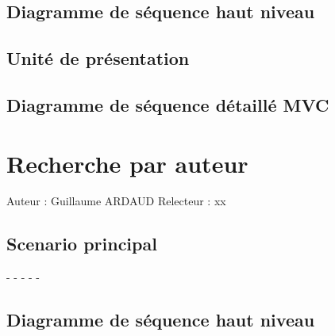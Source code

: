 \documentclass[a4paper,10pt]{report}
\begin{document}
\bigskip

\section*{Diagramme de séquence haut niveau}

\newpage

\section*{Unité de présentation}

\section*{Diagramme de séquence détaillé MVC}

\newpage


\chapter*{Recherche par auteur}

Auteur : Guillaume ARDAUD
Relecteur : xx

\bigskip
\section*{Scenario principal}
\begin{flushleft}
-
-
-
-
-
\end{flushleft}

\bigskip

\section*{Diagramme de séquence haut niveau}
\end{document}
